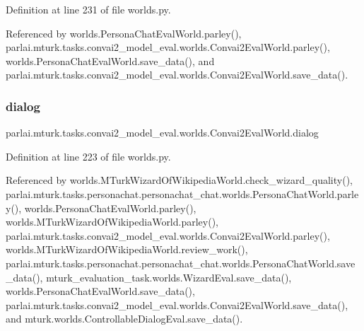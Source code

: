 Definition at line 231 of file worlds.\+py.



Referenced by worlds.\+Persona\+Chat\+Eval\+World.\+parley(), parlai.\+mturk.\+tasks.\+convai2\+\_\+model\+\_\+eval.\+worlds.\+Convai2\+Eval\+World.\+parley(), worlds.\+Persona\+Chat\+Eval\+World.\+save\+\_\+data(), and parlai.\+mturk.\+tasks.\+convai2\+\_\+model\+\_\+eval.\+worlds.\+Convai2\+Eval\+World.\+save\+\_\+data().

\mbox{\label{classparlai_1_1mturk_1_1tasks_1_1convai2__model__eval_1_1worlds_1_1Convai2EvalWorld_aec96ec1a4f5a8022f4c9b340e6deb406}} 
\subsubsection{\texorpdfstring{dialog}{dialog}}
{\footnotesize\ttfamily parlai.\+mturk.\+tasks.\+convai2\+\_\+model\+\_\+eval.\+worlds.\+Convai2\+Eval\+World.\+dialog}



Definition at line 223 of file worlds.\+py.



Referenced by worlds.\+M\+Turk\+Wizard\+Of\+Wikipedia\+World.\+check\+\_\+wizard\+\_\+quality(), parlai.\+mturk.\+tasks.\+personachat.\+personachat\+\_\+chat.\+worlds.\+Persona\+Chat\+World.\+parley(), worlds.\+Persona\+Chat\+Eval\+World.\+parley(), worlds.\+M\+Turk\+Wizard\+Of\+Wikipedia\+World.\+parley(), parlai.\+mturk.\+tasks.\+convai2\+\_\+model\+\_\+eval.\+worlds.\+Convai2\+Eval\+World.\+parley(), worlds.\+M\+Turk\+Wizard\+Of\+Wikipedia\+World.\+review\+\_\+work(), parlai.\+mturk.\+tasks.\+personachat.\+personachat\+\_\+chat.\+worlds.\+Persona\+Chat\+World.\+save\+\_\+data(), mturk\+\_\+evaluation\+\_\+task.\+worlds.\+Wizard\+Eval.\+save\+\_\+data(), worlds.\+Persona\+Chat\+Eval\+World.\+save\+\_\+data(), parlai.\+mturk.\+tasks.\+convai2\+\_\+model\+\_\+eval.\+worlds.\+Convai2\+Eval\+World.\+save\+\_\+data(), and mturk.\+worlds.\+Controllable\+Dialog\+Eval.\+save\+\_\+data().

